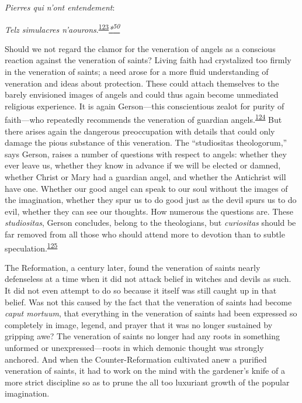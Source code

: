 \emph{Pierres qui n'ont entendement}:

\emph{Telz simulacres
n'aourons}.\textsuperscript{\protect\hypertarget{13_Chapter_Six__THE_DEPICTION_OF_TH.xhtmlux5cux23id_1027}{\protect\hyperlink{23_NOTES.xhtmlux5cux23id_1028}{123}}}\emph{\protect\hypertarget{13_Chapter_Six__THE_DEPICTION_OF_TH.xhtmlux5cux23id_3075}{\protect\hyperlink{23_NOTES.xhtmlux5cux23id_3076}{*\textsuperscript{50}}}}

Should we not regard the clamor for the veneration of angels as a
conscious reaction against the veneration of saints? Living faith had
crystalized too firmly in the veneration of saints; a need arose for a
more fluid understanding of veneration and ideas about protection. These
could attach themselves to the barely envisioned images of angels and
could thus again become unmediated religious experience. It is again
Gerson---this conscientious zealot for purity of faith---who repeatedly
recommends the veneration of guardian
angels.\textsuperscript{\protect\hypertarget{13_Chapter_Six__THE_DEPICTION_OF_TH.xhtmlux5cux23id_1025}{\protect\hyperlink{23_NOTES.xhtmlux5cux23id_1026}{124}}}
But there arises again the dangerous preoccupation with details that
could only damage the pious substance of this veneration. The
``studiositas theologorum,'' says Gerson, raises a number of questions
with respect to angels: whether they ever leave us, whether they know in
advance if we will be elected or damned, whether Christ or Mary had a
guardian angel, and whether the Antichrist will have one. Whether our
good angel can speak to our soul without the images of the imagination,
whether they spur us
\protect\hypertarget{13_Chapter_Six__THE_DEPICTION_OF_TH.xhtmlux5cux23page_202}{}{}to
do good just as the devil spurs us to do evil, whether they can see our
thoughts. How numerous the questions are. These \emph{studiositas},
Gerson concludes, belong to the theologians, but \emph{curiositas}
should be far removed from all those who should attend more to devotion
than to subtle
speculation.\textsuperscript{\protect\hypertarget{13_Chapter_Six__THE_DEPICTION_OF_TH.xhtmlux5cux23id_1023}{\protect\hyperlink{23_NOTES.xhtmlux5cux23id_1024}{125}}}

The Reformation, a century later, found the veneration of saints nearly
defenseless at a time when it did not attack belief in witches and
devils as such. It did not even attempt to do so because it itself was
still caught up in that belief. Was not this caused by the fact that the
veneration of saints had become \emph{caput mortuum}, that everything in
the veneration of saints had been expressed so completely in image,
legend, and prayer that it was no longer sustained by gripping awe? The
veneration of saints no longer had any roots in something unformed or
unexpressed---roots in which demonic thought was strongly anchored. And
when the Counter-Reformation cultivated anew a purified veneration of
saints, it had to work on the mind with the gardener's knife of a more
strict discipline so as to prune the all too luxuriant growth of the
popular imagination.
